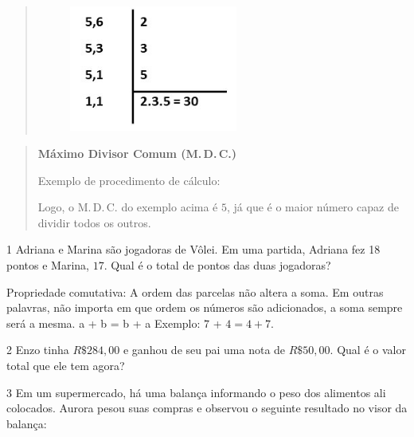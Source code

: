 {\begin{quote}
\begin{figure}
\includegraphics[width=2.18605in,height=1.62945in]{./imgSAEB_6_MAT/media/image21.jpeg}
\end{figure}
\end{quote}

\begin{quote}
\noindent\textbf{Máximo Divisor Comum (M.\,D.\,C.)}

\noindent Exemplo de procedimento de cálculo:


Logo, o M.\,D.\,C. do exemplo acima é $5$, já que é o maior número capaz de
dividir todos os outros.
\end{quote}


\num{1} Adriana e Marina são jogadoras de Vôlei. Em uma partida, Adriana fez
18 pontos e Marina, $17$. Qual é o total de pontos das duas jogadoras?



\noindent Propriedade comutativa: A ordem das parcelas não
altera a soma. Em outras palavras, não importa em que ordem os números
são adicionados, a soma sempre será a mesma. a + b = b + a Exemplo: $7$ +
$4 = 4 + 7$.

\num{2}  Enzo tinha $R\$284,00$ e ganhou de seu pai uma nota de $R\$50,00$. Qual é
o valor total que ele tem agora?


\num{3}  Em um supermercado, há uma balança informando o peso dos alimentos
ali colocados. Aurora pesou suas compras e observou o seguinte resultado
no visor da balança:

}
